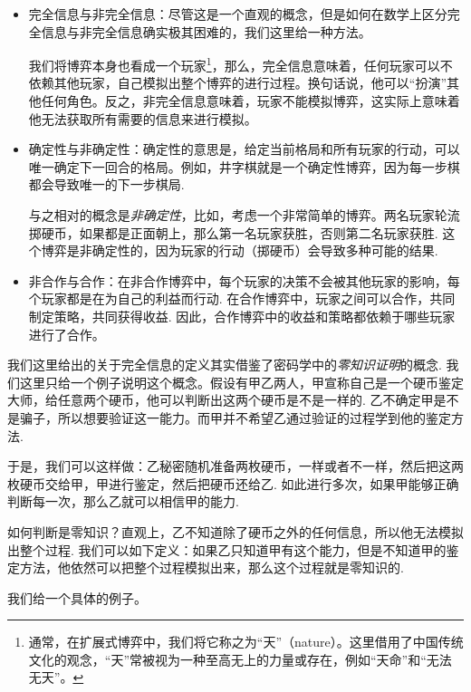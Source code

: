 \begin{itemize}
    \item 完全信息与非完全信息：尽管这是一个直观的概念，但是如何在数学上区分完全信息与非完全信息确实极其困难的，我们这里给一种方法。
    
    我们将博弈本身也看成一个玩家\footnote{通常，在扩展式博弈中，我们将它称之为“天”（nature）。这里借用了中国传统文化的观念，“天”常被视为一种至高无上的力量或存在，例如“天命”和“无法无天”。}，那么，完全信息意味着，任何玩家可以不依赖其他玩家，自己模拟出整个博弈的进行过程。换句话说，他可以“扮演”其他任何角色。反之，非完全信息意味着，玩家不能模拟博弈，这实际上意味着他无法获取所有需要的信息来进行模拟。

    \item 确定性与非确定性：确定性的意思是，给定当前格局和所有玩家的行动，可以唯一确定下一回合的格局。例如，井字棋就是一个确定性博弈，因为每一步棋都会导致唯一的下一步棋局.
    
    与之相对的概念是\emph{非确定性}，比如，考虑一个非常简单的博弈。两名玩家轮流掷硬币，如果都是正面朝上，那么第一名玩家获胜，否则第二名玩家获胜. 这个博弈是非确定性的，因为玩家的行动（掷硬币）会导致多种可能的结果.

    \item 非合作与合作：在非合作博弈中，每个玩家的决策不会被其他玩家的影响，每个玩家都是在为自己的利益而行动. 在合作博弈中，玩家之间可以合作，共同制定策略，共同获得收益. 因此，合作博弈中的收益和策略都依赖于哪些玩家进行了合作。
\end{itemize}

\begin{remark}
    我们这里给出的关于完全信息的定义其实借鉴了密码学中的\emph{零知识证明}的概念. 我们这里只给一个例子说明这个概念。假设有甲乙两人，甲宣称自己是一个硬币鉴定大师，给任意两个硬币，他可以判断出这两个硬币是不是一样的. 乙不确定甲是不是骗子，所以想要验证这一能力。而甲并不希望乙通过验证的过程学到他的鉴定方法. 
    
    于是，我们可以这样做：乙秘密随机准备两枚硬币，一样或者不一样，然后把这两枚硬币交给甲，甲进行鉴定，然后把硬币还给乙. 如此进行多次，如果甲能够正确判断每一次，那么乙就可以相信甲的能力. 

    如何判断是零知识？直观上，乙不知道除了硬币之外的任何信息，所以他无法模拟出整个过程. 我们可以如下定义：如果乙只知道甲有这个能力，但是不知道甲的鉴定方法，他依然可以把整个过程模拟出来，那么这个过程就是零知识的. 
\end{remark}

我们给一个具体的例子。

